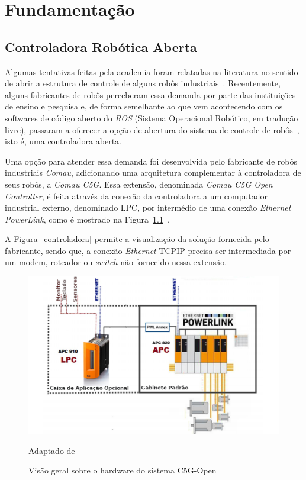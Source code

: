 \chapter{Fundamentação}
    \label{chp:Fundamentos}

	\section{Controladora Robótica Aberta}
	
        Algumas tentativas feitas pela academia foram relatadas na literatura no sentido de abrir a estrutura de controle de alguns robôs industriais~\cite{ROBERTI:2010}. Recentemente, alguns fabricantes de robôs perceberam essa demanda por parte das instituições de ensino e pesquisa e, de forma semelhante ao que vem acontecendo com os softwares de código aberto do \textit{ROS} (Sistema Operacional Robótico, em tradução livre), passaram a oferecer a opção de abertura do sistema de controle de robôs~\cite{KUBUS:2010}, isto é, uma controladora aberta. 
        
        Uma opção para atender essa demanda foi desenvolvida pelo fabricante de robôs industriais \textit{Comau}, adicionando uma arquitetura complementar à controladora de seus robôs, a \textit{Comau C5G}. Essa extensão, denominada \textit{Comau C5G Open Controller}, é feita através da conexão da controladora a um computador industrial externo, denominado \ac{LPC}, por intermédio de uma conexão \textit{Ethernet PowerLink}, como é mostrado na Figura~\ref{controladora2}~\cite{ANTONELLI:2010}.
        
        A Figura~\ref{controladora} permite a visualização da solução fornecida pelo fabricante, sendo que, a conexão \textit{Ethernet} \ac{TCPIP} precisa ser intermediada por um modem, roteador ou \textit{switch} não fornecido nessa extensão.
        
        \begin{figure}[ht]
            \centering
            \includegraphics[width=\columnwidth]{imagens/Conexoes/controladora2.png}
            \small 
            \centering 
            \caption{Visão geral sobre o hardware do sistema C5G-Open}
            Adaptado de~\cite{Ferrara:2013}
            \label{controladora2}
        \end{figure}
        
